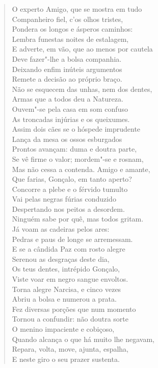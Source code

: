 \begin{verse}
O experto Amigo, que se mostra em tudo\\
Companheiro fiel, c'os olhos tristes,\\
Pondera os longos e ásperos caminhos:\\
Lembra funestas noites de estalagem,\\
E adverte, em vão, que ao menos por cautela\\
Deve fazer"-lhe a bolsa companhia.\\
Deixando enfim inúteis argumentos\\
Remete a decisão ao próprio braço.\\
Não se esquecem das unhas, nem dos dentes,\\
Armas que a todos deu a Natureza.\\
Ouvem"-se pela casa em som confuso\\
As troncadas injúrias e os queixumes.\\
Assim dois cães se o hóspede imprudente\\
Lança da mesa os ossos esburgados\\
Prontos avançam: duma e doutra parte,\\
Se vê firme o valor; mordem"-se e rosnam,\\ 
Mas não cessa a contenda. Amigo e amante,\\
Que farias, Gonçalo, em tanto aperto?\\
Concorre a plebe e o férvido tumulto\\
Vai pelas negras fúrias conduzido\\ 
Despertando nos peitos a desordem.\\
Ninguém sabe por quê, mas todos gritam.\\
Já voam as cadeiras pelos ares:\\
Pedras e paus de longe se arremessam.\\
E se a cândida Paz com rosto alegre\\
Serenou as desgraças deste dia,\\
Os teus dentes, intrépido Gonçalo,\\
Viste voar em negro sangue envoltos. \\[10pt]


Torna alegre Narcisa, e cinco vezes\\
Abriu a bolsa e numerou a prata.\\
Fez diversas porções que num momento\\
Tornou a confundir: não doutra sorte\\
O menino impaciente e cobiçoso,\\
Quando alcança o que há muito lhe negavam,\\
Repara, volta, move, ajunta, espalha,\\
E neste giro o seu prazer sustenta. \\[10pt] 



\end{verse}
